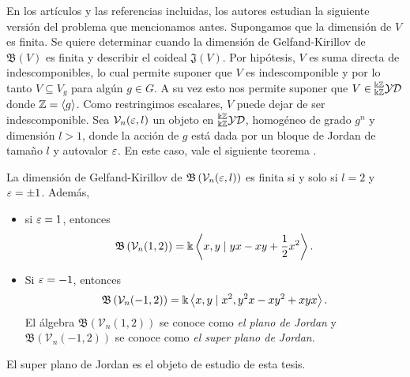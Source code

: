 \documentclass[a4paper,oneside,fleqn,11pt,../tesis.tex]{subfiles}
\begin{document}
En los artículos  y las referencias incluidas, los autores estudian la siguiente versión del problema que mencionamos antes. Supongamos que la dimensión de $V$ es finita. Se quiere determinar cuando
la dimensión de Gelfand-Kirillov de $\mathfrak{B}(V)$ es finita y describir el coideal $\mathfrak{J}(V)$.
Por hipótesis, $V$ es suma directa de indescomponibles, lo cual permite suponer
que $V$ es indescomponible y por lo tanto $V \subseteq V_g$ para algún $g \in G$. A su vez esto nos permite suponer
que $V \in \prescript{\Bbbk\mathbb{Z}}{\Bbbk\mathbb{Z}}{\mathcal{YD}}$ donde $\mathbb{Z} = \left\langle g \right\rangle$. Como restringimos escalares, $V$ puede dejar de ser indescomponible. Sea $\mathcal{V}_n(\varepsilon, l)$ un objeto en $\prescript{\Bbbk\mathbb{Z}}{\Bbbk\mathbb{Z}}{\mathcal{YD}}$, homogéneo de grado $g^n$ y dimensión $l > 1$, 
donde la acción de $g$ está dada por un bloque de Jordan de tamaño $l$ y autovalor $\varepsilon$.
En este caso, vale el siguiente teorema .

\begin{Teorema}
La dimensión de Gelfand-Kirillov de $\mathfrak{B}\left(\mathcal{V}_n(\varepsilon, l)\right)$ es finita si y solo si $l = 2$ y $\varepsilon = \pm 1$.
Además,
\begin{itemize}
	\item si $\varepsilon = 1$, entonces
	\[
		\mathfrak{B}\left(\mathcal{V}_n(1, 2)\right) = \Bbbk\left\langle x, y \mid yx - xy + \frac{1}{2}x^2 \right\rangle.
	\]
	\item Si $\varepsilon = -1$, entonces
	\[
		\mathfrak{B}\left(\mathcal{V}_n(-1, 2)\right) = \Bbbk\left\langle x, y \mid x^2, y^2x - xy^2 + xyx \right\rangle.
	\]
	El álgebra $\mathfrak{B}\left(\mathcal{V}_n(1, 2)\right)$ se conoce como \emph{el plano de Jordan}
	y $\mathfrak{B}\left(\mathcal{V}_n(-1, 2)\right)$ se conoce como \emph{el super plano de Jordan}.
\end{itemize}
\end{Teorema}
El super plano de Jordan es el objeto de estudio de esta tesis.
\end{document}
